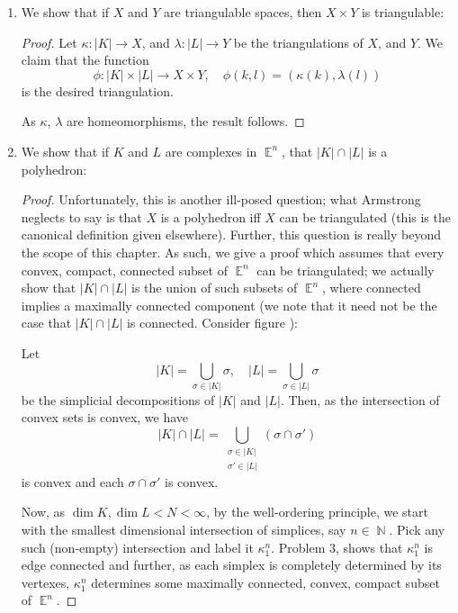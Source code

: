 \documentclass{book}
\DeclareMathOperator*{\N}{\mathbb{N}}
\DeclareMathOperator*{\E}{\mathbb{E}}
\begin{document}
\begin{enumerate}[(1)]
    \item We show that if $X$ and $Y$ are triangulable spaces, then $X \times Y$ is triangulable: 
        \begin{proof} Let $\kappa: |K| \rightarrow X$, and $\lambda: |L| \rightarrow Y$ be the triangulations of $X$, and $Y$. We claim that the function 
            \[\phi: |K| \times |L| \rightarrow X \times Y, \quad \phi(k,l) = (\kappa(k), \lambda(l))\]
            is the desired triangulation. 
            \par As $\kappa$, $\lambda$ are homeomorphisms, the result follows. 
        \end{proof}

    \item We show that if $K$ and $L$ are complexes in $\E^n$, that $|K| \cap |L|$ is a polyhedron: 
        \begin{proof} Unfortunately, this is another ill-posed question; what Armstrong neglects to say is that $X$ is a polyhedron iff $X$ can be triangulated (this is the canonical definition given elsewhere). Further, this question is really beyond the scope of this chapter. As such, we give a proof which assumes that every convex, compact, connected subset of $\E^n$ can be triangulated; we actually show that $|K| \cap |L|$ is the union of such subsets of $\E^n$, where connected implies a maximally connected component (we note that it need not be the case that $|K| \cap |L|$ is connected. Consider figure ):  
            \par Let 
            \[|K| = \bigcup_{\sigma \in |K|} \sigma, \quad |L| = \bigcup_{\sigma \in |L|} \sigma \]
            be the simplicial decompositions of $|K|$ and $|L|$. 
            Then, as the intersection of convex sets is convex, we have 
            \[|K| \cap |L| = \bigcup_{\substack{\sigma \in |K| \\ \sigma' \in |L|}} (\sigma \cap \sigma')\]
            is convex and each $\sigma \cap \sigma'$ is convex. 
            \par Now, as $\dim K,  \dim L < N < \infty$, by the well-ordering principle, we start with the smallest dimensional intersection of simplices, say $n \in \N$. Pick any such (non-empty) intersection and label it $\kappa^n_1$. Problem $3$, shows that $\kappa^n_1$ is edge connected and further, as each simplex is completely determined by its vertexes, $\kappa^n_1$ determines some maximally connected, convex, compact subset of $\E^n$.   

\end{proof}
\end{enumerate}
\end{document}
